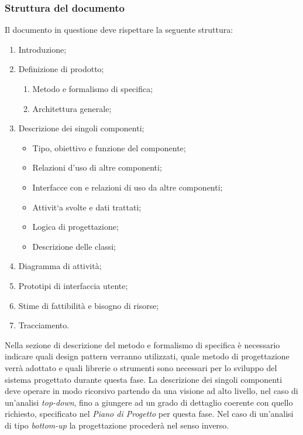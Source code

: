     \subsubsection{Struttura del documento}
        Il documento in questione deve rispettare la seguente struttura:
        \begin{enumerate}
        
        
        \item Introduzione;
        \item Definizione di prodotto;
        \begin{enumerate}
        \item Metodo e formalismo di specifica;
        \item Architettura generale;
        \end{enumerate}
        \item Descrizione dei singoli componenti;
        \begin{itemize}
        \item Tipo, obiettivo e funzione del componente;
        \item Relazioni d’uso di altre componenti;
        \item Interfacce con e relazioni di uso da altre componenti;
        \item Attivit`a svolte e dati trattati;
        \item Logica di progettazione;
        \item Descrizione delle classi;
        \end{itemize}
        \item Diagramma di attività;
        \item Prototipi di interfaccia utente;
        \item Stime di fattibilità e bisogno di risorse;
        \item Tracciamento.
        \end{enumerate}
        Nella sezione di descrizione del metodo e formalismo di specifica è necessario  indicare quali design pattern verranno utilizzati, quale metodo di progettazione verrà adottato e quali librerie o strumenti sono necessari per lo sviluppo del sistema progettato durante questa fase. La descrizione dei singoli componenti deve operare in modo ricorsivo partendo da una visione ad alto livello, nel caso di un’analisi \emph{top-down}, fino a giungere ad un grado di dettaglio coerente con quello richiesto, specificato nel \emph{Piano di Progetto}  per questa fase. Nel caso di un’analisi di tipo \emph{bottom-up} la progettazione procederà nel senso inverso.  


